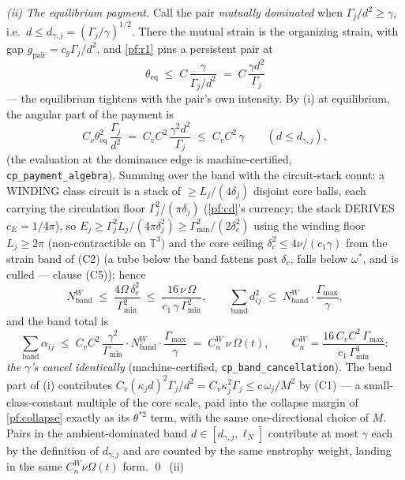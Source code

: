 \documentclass[11pt,letterpaper]{amsart}
\theoremstyle{definition}
\theoremstyle{remark}
\newcommand{\TT}{\mathbb{T}}
\newcommand{\om}{\omega}
\begin{document}
\emph{(ii) The equilibrium payment.} Call the pair \emph{mutually dominated} when
$\Gamma_j/d^2\ge\gamma$, i.e.\ $d\le d_{\gamma,j}=(\Gamma_j/\gamma)^{1/2}$. There the
mutual strain is the organizing strain, with gap $g_{\mathrm{pair}}=c_g\Gamma_j/d^2$,
and \cref{pf:r1} pins a persistent pair at
\[
\theta_{\mathrm{eq}}\;\le\;C\,\frac{\gamma}{\Gamma_j/d^2}\;=\;C\,\frac{\gamma d^2}{\Gamma_j}
\]
--- the equilibrium tightens with the pair's own intensity. By (i) at equilibrium,
the angular part of the payment is
\[
C_v\theta_{\mathrm{eq}}^2\,\frac{\Gamma_j}{d^2}
\;=\;C_vC^2\,\frac{\gamma^2d^2}{\Gamma_j}
\;\le\;C_vC^2\,\gamma\qquad(d\le d_{\gamma,j}),
\]
(the evaluation at the dominance edge is machine-certified,
\texttt{cp\_payment\_algebra}). Summing over the band with the circuit-stack
count: a WINDING class circuit is a stack of $\ge L_j/(4\delta_j)$ disjoint core
balls, each carrying the circulation floor $\Gamma_j^2/(\pi\delta_j)$
(\cref{pf:cd}'s currency; the stack DERIVES $c_E=1/4\pi$), so
$E_j\ge\Gamma_j^2L_j/(4\pi\delta_j^2)\ge\Gamma_{\min}^2/(2\delta_c^2)$ using
the winding floor $L_j\ge2\pi$ (non-contractible on $\TT^3$) and the core
ceiling $\delta_c^2\le4\nu/(c_1\gamma)$ from the strain band of (C2) (a tube
below the band fattens past $\delta_c$, falls below $\om^*$, and is culled ---
clause (C5)); hence
\[
N_{\mathrm{band}}^{W}\;\le\;\frac{4\Omega\,\delta_c^2}{\Gamma_{\min}^2}
\;\le\;\frac{16\,\nu\,\Omega}{c_1\,\gamma\,\Gamma_{\min}^2},
\qquad
\sum_{\mathrm{band}}d_{ij}^2\;\le\;N_{\mathrm{band}}^{W}\cdot\frac{\Gamma_{\max}}{\gamma},
\]
and the band total is
\[
\sum_{\mathrm{band}}\alpha_{ij}
\;\le\;C_vC^2\,\frac{\gamma^2}{\Gamma_{\min}}\cdot
N_{\mathrm{band}}^{W}\cdot\frac{\Gamma_{\max}}{\gamma}
\;=\;C_n^{W}\,\nu\,\Omega(t),
\qquad
C_n^{W}=\frac{16\,C_vC^2\,\Gamma_{\max}}{c_1\,\Gamma_{\min}^3} :
\]
\emph{the $\gamma$'s cancel identically} (machine-certified,
\texttt{cp\_band\_cancellation}). The bend part of (i) contributes
$C_v(\kappa_jd)^2\Gamma_j/d^2=C_v\kappa_j^2\Gamma_j\le c\,\om_j/M^2$ by (C1) --- a
small-class-constant multiple of the core scale, paid into the collapse margin of
\cref{pf:collapse} exactly as its $\theta^{*2}$ term, with the same one-directional
choice of $M$. Pairs in the ambient-dominated band
$d\in[d_{\gamma,j},\ell_N]$ contribute at most $\gamma$ each by the definition of
$d_{\gamma,j}$ and are counted by the same enstrophy weight, landing in the same
$C_n^{W}\nu\Omega(t)$ form. \qed\ (ii)
\end{document}
